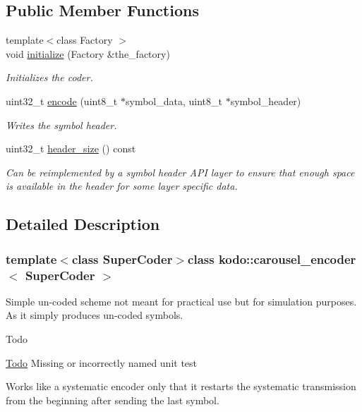 \subsection*{Public Member Functions}
\begin{DoxyCompactItemize}
\item 
{\footnotesize template$<$class Factory $>$ }\\void \hyperlink{classkodo_1_1carousel__encoder_a1b1a0f4b2f4eebfd41220fa78b584c27}{initialize} (Factory \&the\-\_\-factory)
\begin{DoxyCompactList}\small\item\em Initializes the coder. \end{DoxyCompactList}\item 
uint32\-\_\-t \hyperlink{classkodo_1_1carousel__encoder_ac12f84a17e3098bbec413d9e22b8b181}{encode} (uint8\-\_\-t $\ast$symbol\-\_\-data, uint8\-\_\-t $\ast$symbol\-\_\-header)
\begin{DoxyCompactList}\small\item\em Writes the symbol header. \end{DoxyCompactList}\item 
uint32\-\_\-t \hyperlink{classkodo_1_1carousel__encoder_a46d399441a7db1b3d1b7984dcbea1922}{header\-\_\-size} () const 
\begin{DoxyCompactList}\small\item\em Can be reimplemented by a symbol header A\-P\-I layer to ensure that enough space is available in the header for some layer specific data. \end{DoxyCompactList}\end{DoxyCompactItemize}


\subsection{Detailed Description}
\subsubsection*{template$<$class Super\-Coder$>$class kodo\-::carousel\-\_\-encoder$<$ Super\-Coder $>$}

Simple un-\/coded scheme not meant for practical use but for simulation purposes. As it simply produces un-\/coded symbols. 

\begin{DoxyRefDesc}{Todo}
\item[\hyperlink{todo__todo000026}{Todo}]Missing or incorrectly named unit test\end{DoxyRefDesc}
Works like a systematic encoder only that it restarts the systematic transmission from the beginning after sending the last symbol.

